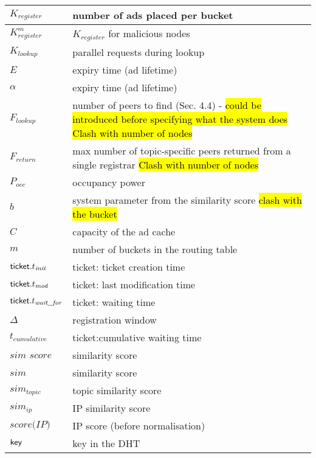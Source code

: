 \begin{table*}
\begin{center}
\begin{tabular}{ | l | p{16cm} |}
      $K_{\textit{register}}$ & number of ads placed per bucket\\ \hline
      $K^m_{\textit{register}}$ & $K_{\textit{register}}$ for malicious nodes \\ \hline
      $K_{\textit{lookup}}$ & parallel requests during lookup\\ \hline
      $E$ & expiry time (ad lifetime) \\ \hline
      $\alpha$ & expiry time (ad lifetime) \\ \hline
      $F_{\textit{lookup}}$ & number of peers to find (Sec. 4.4) - \hl{could be introduced before specifying what the system does}  \hl{Clash with number of nodes} \\ \hline
      $F_{\textit{return}}$ & max number of topic-specific peers returned from a single registrar \hl{Clash with number of nodes} \\ \hline
      $P_\textit{occ}$ & occupancy power \\ \hline
      $b$ & system parameter from the similarity score \hl{clash with the bucket} \\ \hline
      $C$ & capacity of the ad cache \\ \hline
      $m$ & number of buckets in the routing table \\ \hline

      $\mathsf{ticket}.t_{\textit{init}}$ & ticket: ticket creation time \\ \hline
      $\mathsf{ticket}.t_{\textit{mod}}$ & ticket: last modification time \\ \hline
      $\mathsf{ticket}.t_{\textit{wait\_for}}$ & ticket: waiting time \\ \hline
      $\Delta$ & registration window\\ \hline
      $t_{\textit{cumulative}}$ & ticket:cumulative waiting time \\ \hline

      $\textit{sim score}$ & similarity score \\ \hline
      $\textit{sim}$ & similarity score \\ \hline
      $\textit{sim}_\textit{topic}$ & topic similarity score \\ \hline
      $\textit{sim}_{ip}$ & IP similarity score \\ \hline
      $\textit{score(IP)}$ & IP score (before normalisation) \\ \hline


      $\mathsf{key}$ & key in the DHT \\ \hline
    \hline
  \end{tabular}
\end{center}
\end{table*}

